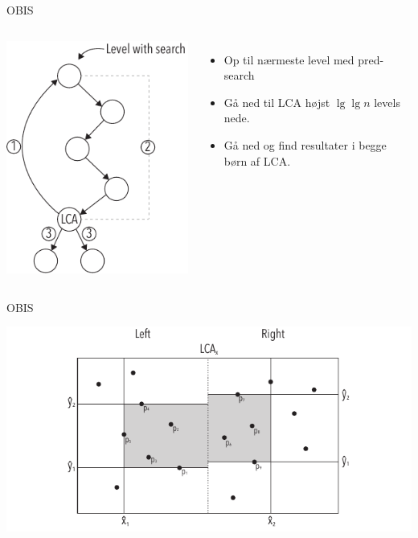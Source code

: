 \documentclass[pdf]{beamer}
\begin{document}
\begin{frame}{OBIS}
  \begin{columns}
    \includegraphics{pictures/ors_step2-eps-converted-to.pdf}
    \begin{itemize}
      \item Op til nærmeste level med pred-search
      \item Gå ned til LCA højst $\lg \lg n$ levels nede.
      \item Gå ned og find resultater i begge børn af LCA.
    \end{itemize}

  \end{columns}
\end{frame}

\begin{frame}{OBIS}

  \includegraphics{pictures/ors_step3-eps-converted-to.pdf}
\end{frame}
\end{document}
